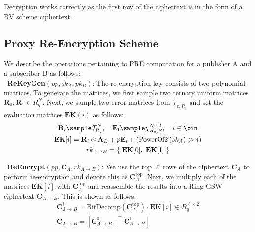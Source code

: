 Decryption works correctly as the first row of the ciphertext is in the form of a BV scheme ciphertext.

\subsection{Proxy Re-Encryption Scheme}

We describe the operations pertaining to PRE computation for a publisher A and a subscriber B as follows:\\
\noindent \textbullet~\textbf{ReKeyGen}$\left(pp,sk_A,pk_B\right)$: The re-encryption key consists of two polynomial matrices. To generate the matrices, we first sample two ternary uniform matrices $\textbf{R}_0, \textbf{R}_1 \in R_q^N$. Next, we sample two error matrices from $\chi_{e,R_q}$ and set the evaluation matrices $\mathbf{EK}\left(i \right)$ as follows:
\begin{equation*}
\begin{gathered}
\mathbf{R}_i \sample \mathcal{T}_{R_q}^N,  \quad \mathbf{E_i} \sample \chi_{R_q,B}^{N \times 2} , \quad i \in \bin \\
 \mathbf{EK}[i] = \mathbf{R}_i\otimes \mathbf{A}_B + p\mathbf{E}_i + \left( \textrm{PowerOf2}\left( sk_A \right) \gg i \right)\\ 
 rk_{A \rightarrow B} = \left\{\; \mathbf{EK}[0],\;\mathbf{EK}[1]\; \right\}
\end{gathered}
\end{equation*}

\noindent \textbullet~\textbf{ReEncrypt}$\left(pp, \mathbf{C}_A, rk_{A \rightarrow B}\right)$: We use the top $\ell$ rows of the ciphertext $\mathbf{C}_A$ to perform re-encryption and denote this as $\mathbf{C}_A^{\text{top}}$. Next, we multiply each of the matrices $\mathbf{EK}[i]$ with $\mathbf{C}_A^{\text{top}}$ and reassemble the results into a Ring-GSW ciphertext $\mathbf{C}_{A \rightarrow B}$. This is shown as follows:
\begin{equation*}
\begin{gathered}
 \mathbf{C}_{A \rightarrow B}^i = \textrm{BitDecomp}\left( \mathbf{C}_A^{\text{top}} \right)\cdot \mathbf{EK}[i] \in R_q^{\ell \times 2} \\
 \mathbf{C}_{A \rightarrow B} = \left[
\mathbf{C}_{A \rightarrow B}^0 \; ||^\intercal \;
\mathbf{C}_{A \rightarrow B}^1
\right]
\end{gathered}
\end{equation*}

